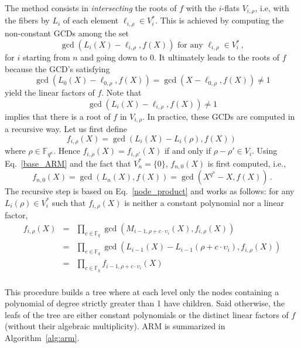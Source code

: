 \documentclass{sig-alternate}
\newcommand{\ff}[1]{\mathbb{F}_{#1}}
\newcommand{\qq}{q}
\newcommand{\nn}{n}
\newcommand{\qn}{{\qq^\nn}}
\newcommand{\basef}{\ff{\qq}}
\newcommand{\extf}{\ff{\qn}}
\renewcommand{\paragraph}[1]{\smallskip\noindent{{\bf \rm #1.}}}
\begin{document}
\paragraph{ARM} The method consists in \emph{intersecting} the roots of $f$ with the $i$-flats  $V_{i,\rho}$, i.e, with the fibers by $L_i$ of each element $\ell_{i,\rho} \in V_i^\ast$.
 This is achieved by computing the non-constant GCDs among the set
 \begin{equation}
 \label{base_ARM}
\gcd(L_i(X)-\ell_{i,\rho},f(X))     \mbox{ for any }  \ell_{i,\rho}  \in V_i^\ast\,,
\end{equation}
for $i$ starting from $n$ and going down to 0.
It ultimately leads to the roots of $f$ because the GCD's satisfying
$$\gcd(L_0(X)-\ell_{0,\rho},f(X))=\gcd(X-\ell_{0,\rho},f(X)) \ne 1$$ 
yield the linear factors of $f$. 
Note that 
\begin{equation}
  \label{eq:duality-gcd}
  \gcd(L_i(X)-\ell_{i,\rho},f(X)) \ne 1
\end{equation}
implies that there is a root of $f$ in $V_{i,\rho}$.
In practice, these GCDs are computed in a recursive way. Let us first define
 $$f_{i,\rho}(X)=\gcd(L_i(X)-L_i(\rho),f(X))\,$$
where $\rho \in \extf$. Hence $f_{i,\rho}(X)=f_{i,\rho'}(X)$ if and only if $\rho-\rho' \in V_i$.
Using Eq.~\eqref{base_ARM} and the fact that $V_n^\ast=\{0\}$, $f_{n,0}(X)$ is first computed, i.e.,
 $$f_{n,0}(X)=\gcd(L_n(X),f(X))=\gcd(X^{q^\nn}-X,f(X))\,.$$
The recursive step is based on Eq.~\eqref{node_product} and works as follows: for any $L_i(\rho) \in V_i^\ast$ such that $f_{i,\rho}(X)$ is neither a constant polynomial nor a linear factor,
  $$
  \begin{array}{lll}
  f_{i,\rho}(X)&=&\prod_{c \in \basef} \gcd(M_{i-1,\rho+c \cdot \upsilon_i}(X),f_{i,\rho}(X)) \\
               &=&\prod_{c \in \basef} \gcd(L_{i-1}(X)-L_{i-1}(\rho+c \cdot \upsilon_i),f_{i,\rho}(X)) \\
               &=&\prod_{c \in \basef} f_{i-1,\rho+c \cdot  \upsilon_i}(X)\\
  \end{array}              
  $$ 
 
 This procedure builds a tree where at each level only the nodes containing a polynomial of degree strictly greater than 1 have children. Said otherwise, the leafs of the tree are either constant polynomials or the distinct linear factors of $f$ (without their algebraic multiplicity). ARM is summarized in Algorithm~\ref{alg:arm}.
\end{document}
